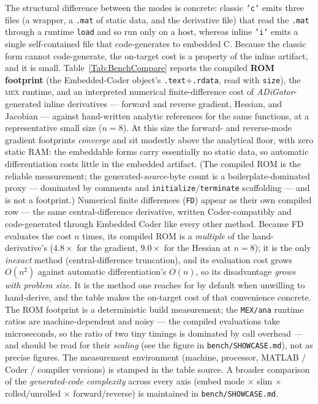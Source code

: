 \documentclass[10pt,pdftex]{article}
\begin{document}
The structural difference between the modes is concrete: classic \texttt{'c'} emits three files (a wrapper, a \texttt{.mat} of static data, and the derivative file) that read the \texttt{.mat} through a runtime \texttt{load} and so run only on a host, whereas inline \texttt{'i'} emits a single self-contained file that code-generates to embedded C. Because the classic form cannot code-generate, the on-target cost is a property of the inline artifact, and it is small. Table~\ref{Tab:BenchCompare} reports the compiled \textbf{ROM footprint} (the Embedded-Coder object's \texttt{.text}+\texttt{.rdata}, read with \texttt{size}), the \textsc{mex} runtime, and an interpreted numerical finite-difference cost of \emph{ADiGator}-generated inline derivatives --- forward and reverse gradient, Hessian, and Jacobian --- against hand-written analytic references for the same functions, at a representative small size ($n=8$). At this size the forward- and reverse-mode gradient footprints \emph{converge} and sit modestly above the analytical floor, with zero static RAM: the embeddable forms carry essentially no static data, so automatic differentiation costs little in the embedded artifact. (The compiled ROM is the reliable measurement; the generated-\emph{source}-byte count is a boilerplate-dominated proxy --- dominated by comments and \texttt{initialize}/\texttt{terminate} scaffolding --- and is not a footprint.) Numerical finite differences (\texttt{FD}) appear as their own compiled row --- the same central-difference derivative, written Coder-compatibly and code-generated through Embedded Coder like every other method. Because FD evaluates the cost $n$ times, its compiled ROM is a \emph{multiple} of the hand-derivative's ($4.8\times$ for the gradient, $9.0\times$ for the Hessian at $n=8$); it is the only \emph{inexact} method (central-difference truncation), and its evaluation cost grows $O(n^2)$ against automatic differentiation's $O(n)$, so its disadvantage \emph{grows with problem size}. It is the method one reaches for by default when unwilling to hand-derive, and the table makes the on-target cost of that convenience concrete. The ROM footprint is a deterministic build measurement; the \texttt{MEX/ana} runtime ratios are machine-dependent and noisy --- the compiled evaluations take microseconds, so the ratio of two tiny timings is dominated by call overhead --- and should be read for their \emph{scaling} (see the figure in \texttt{bench/SHOWCASE.md}), not as precise figures. The measurement environment (machine, processor, MATLAB / Coder / compiler versions) is stamped in the table source. A broader comparison of the \emph{generated-code complexity} across every axis (embed mode $\times$ slim $\times$ rolled/unrolled $\times$ forward/reverse) is maintained in \texttt{bench/SHOWCASE.md}.
\end{document}
